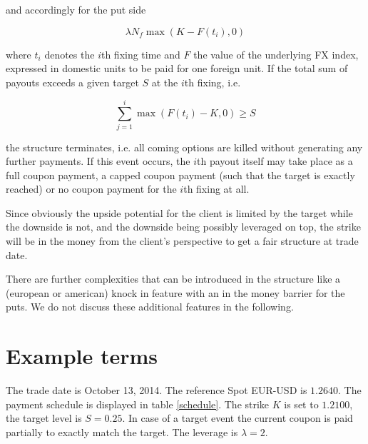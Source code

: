 \documentclass{amsart}
\theoremstyle{plain}
\numberwithin{equation}{section}
\begin{document}
and accordingly for the put side

\begin{equation}
\lambda N_f \max ( K - F(t_i) , 0 )
\end{equation}

where $t_i$ denotes the $i$th fixing time and $F$ the value of the underlying FX index, expressed in domestic units to be paid for one foreign unit. If the total sum of payouts exceeds a given target $S$ at the $i$th fixing, i.e.

\begin{equation}
\sum_{j=1}^i \max( F(t_i) - K, 0) \geq S
\end{equation}

the structure terminates, i.e. all coming options are killed without generating any further payments. If this event occurs, the $i$th payout itself may take place as a full coupon payment, a capped coupon payment (such that the target is exactly reached) or no coupon payment for the $i$th fixing at all.

Since obviously the upside potential for the client is limited by the target while the downside is not, and the downside being possibly leveraged on top, the strike will be in the money from the client's perspective to get a fair structure at trade date.

There are further complexities that can be introduced in the structure like a (european or american) knock in feature with an in the money barrier for the puts. We do not discuss these additional features in the following.

\section{Example terms}

The trade date is October 13, 2014. The reference Spot EUR-USD is $1.2640$. The payment schedule is displayed in table \ref{schedule}. The strike $K$ is set to $1.2100$, the target level is $S=0.25$. In case of a target event the current coupon is paid partially to exactly match the target. The leverage is $\lambda=2$.
\end{document}
